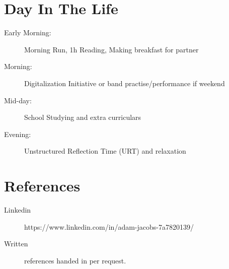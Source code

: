 \documentclass[margin,line,a4paper]{resume}
\begin{document}
\begin{resume}
\section{\mysidestyle Day In The Life}\vspace{1mm}
    \begin{description}
        \item[Early Morning:] Morning Run, 1h Reading, Making breakfast for partner
        \item[Morning:] Digitalization Initiative or band practise/performance if weekend
        \item[Mid-day:] School Studying and extra curriculars
         \item[Evening:] Unstructured Reflection Time (URT) and relaxation
    \end{description} 

\section{\mysidestyle References}
\begin{description}
    \item[Linkedin] https://www.linkedin.com/in/adam-jacobs-7a7820139/
    \item[Written] references handed in per request.
\end{description}

\end{resume}
\end{document}
